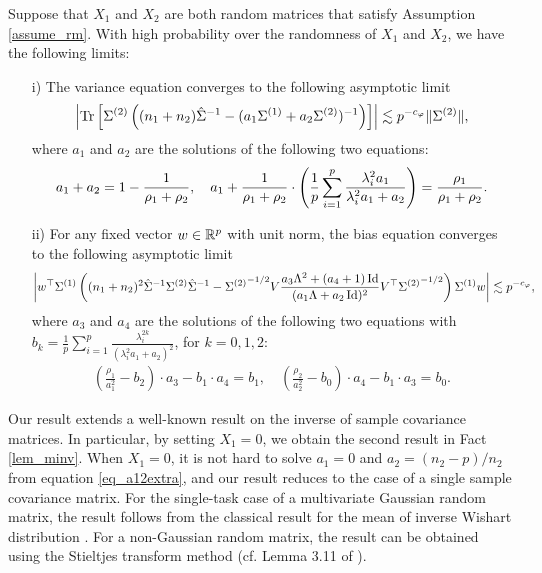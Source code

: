 \begin{theorem}\label{thm_main_RMT}
	Suppose that $X_1$ and $X_2$ are both random matrices that satisfy Assumption \ref{assume_rm}.
	With high probability over the randomness of $X_1$ and $X_2$, we have the following limits:
	\begin{enumerate}
		\item[i)]  The variance equation converges to the following asymptotic limit
			\begin{align}\label{lem_cov_shift_eq}
				{\left| {\operatorname{Tr}\left[\Sigma^{(2)} \left({(n_1 + n_2){\hat{\Sigma}^{-1}} - (a_1 \Sigma^{(1)} + a_2 \Sigma^{(2)})^{-1}}\right)\right]} \right|} \lesssim p^{-c_{\varphi}}\|\Sigma^{(2)}\|,
			\end{align}
			where $a_1$ and $a_2$ are the solutions of the following two equations:
			\begin{align}
				a_1 + a_2 = 1- \frac{1}{\rho_1 + \rho_2},\quad a_1 + \frac1{\rho_1 + \rho_2}\cdot \left({\frac{1}{p}\sum_{i=1}^p \frac{\lambda_i^2 a_1}{\lambda_i^2 a_1 + a_2}}\right) = \frac{\rho_1}{\rho_1 + \rho_2}. \label{eq_a12extra}
			\end{align}
		\item[ii)] For any fixed vector $w\in\mathbb{R}^p$ with unit norm, the bias equation converges to the following asymptotic limit
			\begin{align}\label{lem_cov_derv_eq}
				{\left| {w^{\top} \Sigma^{(1)} \left({(n_1+n_2)^2\hat{\Sigma}^{-1} \Sigma^{(2)} \hat{\Sigma}^{-1} - {\Sigma^{(2)}}^{-1/2} V {\frac{a_3 \Lambda^2 + (a_4 + 1)\operatorname{Id}}{(a_1 \Lambda + a_2\operatorname{Id})^2}} V^{\top} {\Sigma^{(2)}}^{-1/2}}\right) \Sigma^{(1)} w} \right|} \lesssim p^{-c_{\varphi}},
			\end{align}
				where $a_{3}$ and $a_4$ are the solutions of the following two equations with $b_k = \frac1{p}\sum_{i=1}^p \frac{\lambda_i^{2k}} {(\lambda_i^2 a_1 + a_2)^2}$, for $k = 0, 1, 2$:
			\begin{align}\label{eq_a34extra}
				\left(\frac{\rho_1}{a_1^{2}} -  b_2  \right)\cdot  a_3 -  b_1 \cdot  a_4 = b_1,\quad \left(\frac{\rho_2}{a_2^{2}}-  b_0\right)\cdot  a_4 - b_1 \cdot  a_3
				= b_0.
			\end{align}
	\end{enumerate}
\end{theorem}
 Our result extends a well-known result on the inverse of sample covariance matrices.
In particular, by setting $X_1 = 0$, we obtain the second result in Fact \ref{lem_minv}.
When $X_1=0$, it is not hard to solve $a_1 = 0$ and $a_2 = (n_2-p) / n_2$ from equation \eqref{eq_a12extra}, and our result reduces to the case of a single sample covariance matrix.
For the single-task case of a multivariate Gaussian random matrix, the result follows from the classical result for the mean of inverse Wishart distribution \cite{anderson1958introduction}.
For a non-Gaussian random matrix, the result can be obtained using the Stieltjes transform method (cf. Lemma 3.11 of \citet{bai2009spectral}).

